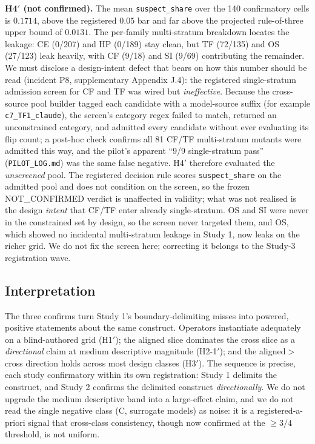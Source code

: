 \documentclass[manuscript,screen,review]{acmart}
\begin{document}
\textbf{H4\('\) (not confirmed).} The mean \texttt{suspect\_share} over
the 140 confirmatory cells is \(0.1714\), above the registered \(0.05\)
bar and far above the projected rule-of-three upper bound of \(0.0131\).
The per-family multi-stratum breakdown locates the leakage: CE
(0/207) and HP (0/189) stay clean, but TF (72/135) and OS (27/123) leak
heavily, with CF (9/18) and SI (9/69) contributing the remainder. We must
disclose a design-intent defect that bears on how this number should be
read (incident P8, supplementary Appendix J.4): the registered
single-stratum admission screen for CF and TF was wired but
\emph{ineffective}. Because the cross-source pool builder tagged each
candidate with a model-source suffix (for example \texttt{c7\_TF1\_claude}),
the screen's category regex failed to match, returned an unconstrained
category, and admitted every candidate without ever evaluating its flip
count; a post-hoc check confirms all 81 CF/TF multi-stratum mutants were
admitted this way, and the pilot's apparent ``9/9 single-stratum pass''
(\texttt{PILOT\_LOG.md}) was the same false negative. H4\('\) therefore
evaluated the \emph{unscreened} pool. The registered decision rule scores
\texttt{suspect\_share} on the admitted pool and does not condition on the
screen, so the frozen NOT\_CONFIRMED verdict is unaffected in validity; what
was not realised is the design \emph{intent} that CF/TF enter already
single-stratum. OS and SI were never in the constrained set by design, so
the screen never targeted them, and OS, which showed no incidental
multi-stratum leakage in Study 1, now leaks on the richer grid. We do not
fix the screen here; correcting it belongs to the Study-3 registration wave.

\subsection{Interpretation}\label{study2-interpretation}

The three confirms turn Study 1's boundary-delimiting misses into
powered, positive statements about the same construct. Operators
instantiate adequately on a blind-authored grid (H1\('\)); the aligned
slice dominates the cross slice as a \emph{directional} claim at medium
descriptive magnitude (H2-1\('\)); and the aligned\(>\)cross direction
holds across most design classes (H3\('\)). The sequence is precise, each
study confirmatory within its own registration:
Study 1 delimits the construct, and Study 2 confirms the delimited
construct \emph{directionally}. We do not upgrade the medium descriptive
band into a large-effect claim, and we do not read the single negative
class (C, surrogate models) as noise: it is a registered-a-priori signal
that cross-class consistency, though now confirmed at the \(\geq 3/4\)
threshold, is not uniform.
\end{document}
